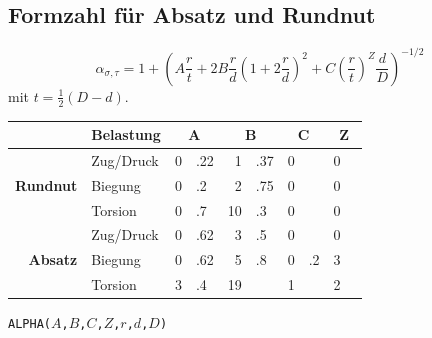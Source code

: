 	\subsection{Formzahl für Absatz und Rundnut} %
		\begin{equation*}
			\alpha_{\sigma,\tau} = 1 + \left( A \frac{r}{t} + 2B \frac{r}{d}\left( 1 + 2 \frac{r}{d}\right)^2 + C \left( \frac{r}{t}\right)^Z \frac{d}{D}\right)^{-1/2}
		\end{equation*}
		mit $t= \frac{1}{2} (D-d)$.
		\begin{center}
			\begin{tabular}{r|lr@{}lr@{}lr@{}lr@{}l}
				\toprule
				& \textbf{Belastung} & \multicolumn{2}{c}{$\boldsymbol A$} & \multicolumn{2}{c}{$\boldsymbol B$} & \multicolumn{2}{c}{$\boldsymbol C$} & \multicolumn{2}{c}{$\boldsymbol Z$} \\
				\midrule
				\multirow{3}{*}{
				\begin{sideways}
					\textbf{Rundnut}
				\end{sideways}
				} & Zug/Druck & 0&.22 & 1&.37 & 0& & 0& \\
				& Biegung & 0&.2 & 2&.75 & 0& & 0& \\
				& Torsion & 0&.7 & 10&.3 & 0& & 0& \\
				\midrule
				\multirow{3}{*}{
				\begin{sideways}
					\textbf{Absatz}
				\end{sideways}
				} & Zug/Druck & 0&.62 & 3&.5 & 0& & 0& \\
				& Biegung & 0&.62 & 5&.8 & 0&.2 & 3& \\
				& Torsion & 3&.4 & 19& & 1& & 2& \\
				\bottomrule
			\end{tabular}
		\end{center}
		\begin{TI}
			\verb=ALPHA(=$A$\verb=,=$B$\verb=,=$C$\verb=,=$Z$\verb=,=$r$\verb=,=$d$\verb=,=$D$\verb=)=
		\end{TI}
